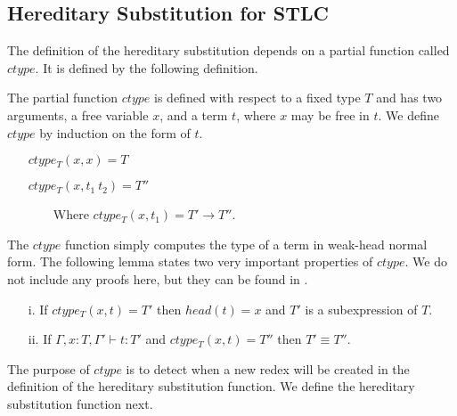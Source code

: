 \documentclass{article}
\begin{document}
\subsection{Hereditary Substitution for STLC}
\label{subsec:hereditary_substitution_for_stlc}
The definition of the hereditary substitution depends on a
partial function called $ctype$.  It is defined by the following definition.
\begin{definition}
  \label{def:ctype_stlc}
  The partial function $ctype$ is defined with respect to a fixed type $T$
  and has two arguments, a free variable $x$, and a term $t$, where $x$
  may be free in $t$.  We define $ctype$ by induction on the form of $t$.
  \begin{itemize}
  \item[] $ctype_T(x,x) = T$
  \item[] $ctype_T(x,t_1\ t_2) = T''$
  \item[] \ \ \ \ Where $ctype_T(x,t_1) = T' \to T''$.
  \end{itemize}
\end{definition}
\noindent
The $ctype$ function simply computes the type of a term in weak-head normal form.
The following lemma states two very important properties of $ctype$.  We
do not include any proofs here, but they can be found in \cite{Eades:2011}.
\begin{lemma}
  \label{lemma:ctype_props_stlc}
  \begin{itemize}
  \item[i.] If $ctype_T(x,t) = T'$ then $head(t) = x$ and $T'$ 
    is a subexpression of $T$.
    
  \item[ii.] If $\Gamma,x:T,\Gamma' \vdash t:T'$ and $ctype_T(x,t) = T''$ then
    $T' \equiv T''$.   
  \end{itemize}
\end{lemma}
\noindent
The purpose of $ctype$ is to detect when a new redex will be created in the
definition of the hereditary substitution function. We define the
hereditary substitution function next.
\end{document}
